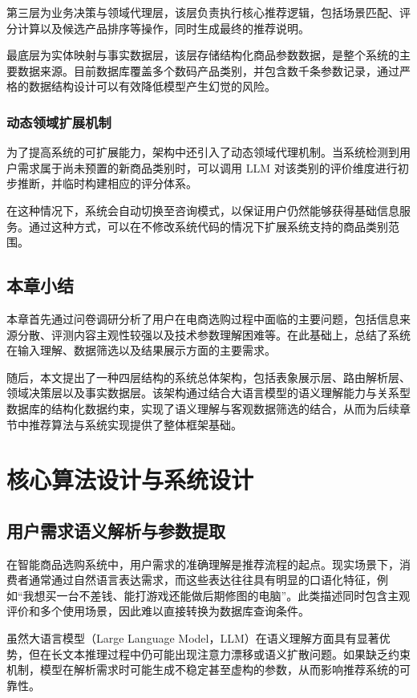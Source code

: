 \documentclass{nkuthesis}
\begin{document}
第三层为业务决策与领域代理层，该层负责执行核心推荐逻辑，包括场景匹配、评分计算以及候选产品排序等操作，同时生成最终的推荐说明。

最底层为实体映射与事实数据层，该层存储结构化商品参数数据，是整个系统的主要数据来源。目前数据库覆盖多个数码产品类别，并包含数千条参数记录，通过严格的数据结构设计可以有效降低模型产生幻觉的风险。

\subsubsection{动态领域扩展机制}

为了提高系统的可扩展能力，架构中还引入了动态领域代理机制。当系统检测到用户需求属于尚未预置的新商品类别时，可以调用 LLM 对该类别的评价维度进行初步推断，并临时构建相应的评分体系。

在这种情况下，系统会自动切换至咨询模式，以保证用户仍然能够获得基础信息服务。通过这种方式，可以在不修改系统代码的情况下扩展系统支持的商品类别范围。

\subsection{本章小结}

本章首先通过问卷调研分析了用户在电商选购过程中面临的主要问题，包括信息来源分散、评测内容主观性较强以及技术参数理解困难等。在此基础上，总结了系统在输入理解、数据筛选以及结果展示方面的主要需求。

随后，本文提出了一种四层结构的系统总体架构，包括表象展示层、路由解析层、领域决策层以及事实数据层。该架构通过结合大语言模型的语义理解能力与关系型数据库的结构化数据约束，实现了语义理解与客观数据筛选的结合，从而为后续章节中推荐算法与系统实现提供了整体框架基础。

\section{核心算法设计与系统设计}

\subsection{用户需求语义解析与参数提取}

在智能商品选购系统中，用户需求的准确理解是推荐流程的起点。现实场景下，消费者通常通过自然语言表达需求，而这些表达往往具有明显的口语化特征，例如“我想买一台不差钱、能打游戏还能做后期修图的电脑”。此类描述同时包含主观评价和多个使用场景，因此难以直接转换为数据库查询条件。

虽然大语言模型（Large Language Model，LLM）在语义理解方面具有显著优势，但在长文本推理过程中仍可能出现注意力漂移或语义扩散问题。如果缺乏约束机制，模型在解析需求时可能生成不稳定甚至虚构的参数，从而影响推荐系统的可靠性。
\end{document}

